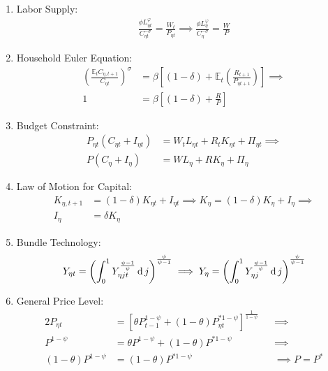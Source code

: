 \documentclass[
	thesis.tex
	]{subfiles}
\begin{document}
\begin{enumerate}
	\item Labor Supply:
	\begin{align}
		\frac{\phi L_{\eta t}^{\varphi}}{C_{\eta t}^{-\sigma}} = \frac{W_t}{P_{\eta t}} \implies \frac{\phi L_{\eta}^{\varphi}}{C_{\eta}^{-\sigma}} = \frac{W}{P} \label{eq:reg-ss-household-labor-supply}
	\end{align}
	
	\item Household Euler Equation: 
	\begin{align}
		\left( \frac{\mathbb{E}_t C_{\eta, t+1}}{C_{\eta t}} \right)^\sigma &= \beta \left[ (1-\delta) + \mathbb{E}_t \left(\frac{R_{t+1}}{P_{\eta t+1}}\right) \right] \implies \nonumber \\
		1 &= \beta \left[ (1-\delta) + \frac{R}{P} \right] \label{eq:reg-ss-household-euler-equation}
	\end{align}
	
	\item Budget Constraint: 
	\begin{align}
		P_{\eta t} (C_{\eta t} + I_{\eta t}) &= W_t L_{\eta t} + R_t K_{\eta t} + \Pi_{\eta t} \implies \nonumber \\
		P (C_{\eta} + I_{\eta}) &= W L_{\eta} + R K_{\eta} + \Pi_{\eta} \label{eq:reg-ss-household-budget-constraint}
	\end{align}
	
	\item Law of Motion for Capital:
	\begin{align}
		K_{\eta, t+1} &= (1-\delta)K_{\eta t} + I_{\eta t} \implies K_{\eta} = (1-\delta)K_{\eta} + I_{\eta} \implies \nonumber \\
		I_{\eta} &= \delta K_{\eta} \label{eq:reg-ss-law-of-motion-for-capital}
	\end{align}
	
	\item Bundle Technology:
	\begin{align}
		Y_{\eta t} = \left( \int_{0}^{1} Y_{\eta jt}^{\frac{\psi-1}{\psi}} \dif j \right)^{\frac{\psi}{\psi-1}} \implies %
		Y_{\eta} = \left( \int_{0}^{1} Y_{\eta j}^{\frac{\psi-1}{\psi}} \dif j \right)^{\frac{\psi}{\psi-1}} \label{eq:reg-ss-final-good-firm-bundle-rule}
	\end{align}
	
	\item General Price Level:
	\begin{alignat}{2}
		\label{eq:reg-ss-general-price-level}
		P_{\eta t} &= \left[ \theta P_{t-1}^{1-\psi} + (1-\theta) P_{\eta t}^{\ast 1-\psi} \right]^\frac{1}{1-\psi} &&\implies \nonumber \\
		P^{1-\psi} &= \theta P^{1-\psi} + (1-\theta) P^{\ast 1-\psi} &&\implies \nonumber \\ 
		(1-\theta) P^{1-\psi} &= (1-\theta) P^{\ast 1-\psi} &&\implies P = P^\ast
	\end{alignat}
	

\end{enumerate}
\end{document}

